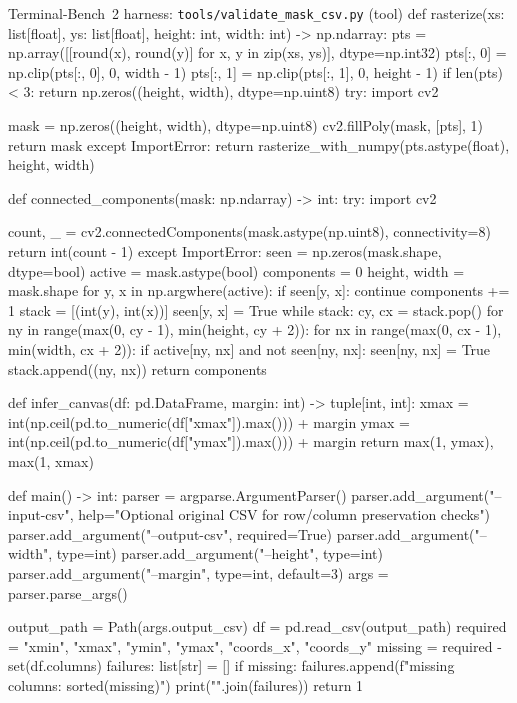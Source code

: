 \documentclass{llmxive}
\begin{document}
\begin{promptbox}{Terminal-Bench~2 harness: \texttt{tools/validate\_mask\_csv.py} (tool)}
def rasterize(xs: list[float], ys: list[float], height: int, width: int) -> np.ndarray:
    pts = np.array([[round(x), round(y)] for x, y in zip(xs, ys)], dtype=np.int32)
    pts[:, 0] = np.clip(pts[:, 0], 0, width - 1)
    pts[:, 1] = np.clip(pts[:, 1], 0, height - 1)
    if len(pts) < 3:
        return np.zeros((height, width), dtype=np.uint8)
    try:
        import cv2

        mask = np.zeros((height, width), dtype=np.uint8)
        cv2.fillPoly(mask, [pts], 1)
        return mask
    except ImportError:
        return rasterize_with_numpy(pts.astype(float), height, width)


def connected_components(mask: np.ndarray) -> int:
    try:
        import cv2

        count, _ = cv2.connectedComponents(mask.astype(np.uint8), connectivity=8)
        return int(count - 1)
    except ImportError:
        seen = np.zeros(mask.shape, dtype=bool)
        active = mask.astype(bool)
        components = 0
        height, width = mask.shape
        for y, x in np.argwhere(active):
            if seen[y, x]:
                continue
            components += 1
            stack = [(int(y), int(x))]
            seen[y, x] = True
            while stack:
                cy, cx = stack.pop()
                for ny in range(max(0, cy - 1), min(height, cy + 2)):
                    for nx in range(max(0, cx - 1), min(width, cx + 2)):
                        if active[ny, nx] and not seen[ny, nx]:
                            seen[ny, nx] = True
                            stack.append((ny, nx))
        return components


def infer_canvas(df: pd.DataFrame, margin: int) -> tuple[int, int]:
    xmax = int(np.ceil(pd.to_numeric(df["xmax"]).max())) + margin
    ymax = int(np.ceil(pd.to_numeric(df["ymax"]).max())) + margin
    return max(1, ymax), max(1, xmax)


def main() -> int:
    parser = argparse.ArgumentParser()
    parser.add_argument("--input-csv", help="Optional original CSV for row/column preservation checks")
    parser.add_argument("--output-csv", required=True)
    parser.add_argument("--width", type=int)
    parser.add_argument("--height", type=int)
    parser.add_argument("--margin", type=int, default=3)
    args = parser.parse_args()

    output_path = Path(args.output_csv)
    df = pd.read_csv(output_path)
    required = {"xmin", "xmax", "ymin", "ymax", "coords_x", "coords_y"}
    missing = required - set(df.columns)
    failures: list[str] = []
    if missing:
        failures.append(f"missing columns: {sorted(missing)}")
        print("\n".join(failures))
        return 1


\end{promptbox}
\end{document}
